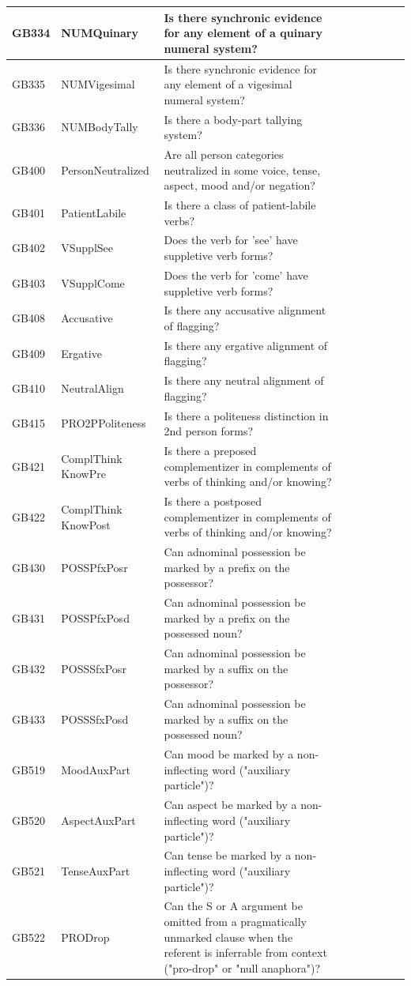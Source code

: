 \documentclass[draft,10pt]{article} %
\begin{document}
\begin{landscape}
\begin{longtable}{| l | p{4cm}| p{12cm}|p{2cm}|p{2cm}|p{2cm}|p{2cm}|p{2cm}|p{2cm}|}
GB334 & NUMQuinary&Is there synchronic evidence for any element of a quinary numeral system?\\ \hline
GB335 & NUMVigesimal&Is there synchronic evidence for any element of a vigesimal numeral system?\\ \hline
GB336 & NUMBodyTally&Is there a body-part tallying system?\\ \hline
GB400 & PersonNeutralized&Are all person categories neutralized in some voice, tense, aspect, mood and/or negation?\\ \hline
GB401 & PatientLabile&Is there a class of patient-labile verbs?\\ \hline
GB402 & VSupplSee&Does the verb for 'see' have suppletive verb forms?\\ \hline
GB403 & VSupplCome&Does the verb for 'come' have suppletive verb forms?\\ \hline
GB408 & Accusative&Is there any accusative alignment of flagging?\\ \hline
GB409 & Ergative&Is there any ergative alignment of flagging?\\ \hline
GB410 & NeutralAlign&Is there any neutral alignment of flagging?\\ \hline
GB415 & PRO2PPoliteness&Is there a politeness distinction in 2nd person forms?\\ \hline
GB421 & ComplThink KnowPre&Is there a preposed complementizer in complements of verbs of thinking and/or knowing?\\ \hline
GB422 & ComplThink KnowPost&Is there a postposed complementizer in complements of verbs of thinking and/or knowing?\\ \hline
GB430 & POSSPfxPosr&Can adnominal possession be marked by a prefix on the possessor?\\ \hline
GB431 & POSSPfxPosd&Can adnominal possession be marked by a prefix on the possessed noun?\\ \hline
GB432 & POSSSfxPosr &Can adnominal possession be marked by a suffix on the possessor?\\ \hline
GB433 & POSSSfxPosd&Can adnominal possession be marked by a suffix on the possessed noun?\\ \hline
GB519 & MoodAuxPart&Can mood be marked by a non-inflecting word ("auxiliary particle")?\\ \hline
GB520 & AspectAuxPart&Can aspect be marked by a non-inflecting word ("auxiliary particle")?\\ \hline
GB521 & TenseAuxPart&Can tense be marked by a non-inflecting word ("auxiliary particle")?\\ \hline
GB522 & PRODrop&Can the S or A argument be omitted from a pragmatically unmarked clause when the referent is inferrable from context ("pro-drop" or "null anaphora")? \\ \hline



 \end{longtable}
\end{landscape}
\newpage
\end{document}
